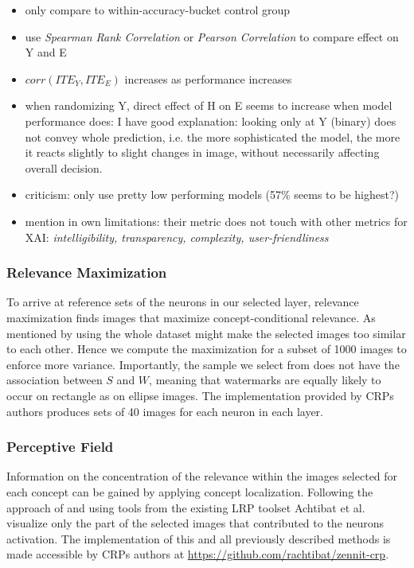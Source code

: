 \begin{itemize}
    \item only compare to within-accuracy-bucket control group
    \item use \textit{Spearman Rank Correlation} or \textit{Pearson Correlation} to compare effect on Y and E
    \item $corr(ITE_Y, ITE_E)$ increases as performance increases
    \item when randomizing Y, direct effect of H on E seems to increase when model performance does: I have good explanation: looking only at Y (binary) does not convey whole prediction, i.e. the more sophisticated the model, the more it reacts slightly to slight changes in image, without necessarily affecting overall decision.
    \item criticism: only use pretty low performing models (57\% seems to be highest?)
    \item mention in own limitations: their metric does not touch with other metrics for XAI: \textit{intelligibility, transparency, complexity, user-friendliness}
\end{itemize}


{\color{gray} \subsubsection{Relevance Maximization}
To arrive at reference sets of the neurons in our selected layer, relevance maximization finds images that maximize concept-conditional relevance. As mentioned by \cite{Achtibat2022} using the whole dataset might make the selected images too similar to each other. Hence we compute the maximization for a subset of 1000 images to enforce more variance. Importantly, the sample we select from does not have the association between $S$ and $W$, meaning that watermarks are equally likely to occur on rectangle as on ellipse images. 
The implementation provided by CRPs authors produces sets of 40 images for each neuron in each layer. 

\subsubsection{Perceptive Field}
Information on the concentration of the relevance within the images selected for each concept can be gained by applying concept localization. Following the approach of \cite{Yeh2020} and using tools from the existing LRP toolset \cite{Anders2023} Achtibat et al. visualize only the part of the selected images that contributed to the neurons activation. 
The implementation of this and all previously described methods is made accessible by CRPs authors at \url{https://github.com/rachtibat/zennit-crp}.
}

